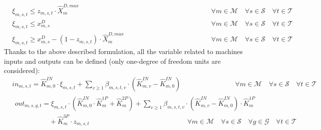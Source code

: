 \documentclass{article}
\newcommand{\cT}{{\mathcal T}}
\newcommand{\cM}{{\mathcal M}}
\newcommand{\cQ}{{\mathcal Q}}
\newcommand{\cC}{{\mathcal C}}
\newcommand{\cS}{{\mathcal S}}
\newcommand{\cG}{{\mathcal G}}
\begin{document}
{\begin{align}
		& \xi_{m,s,t} \leq z_{m,s,t} \cdot \hat{X}_{m}^{D,max} & \hspace{5cm} \forall m \in \cM \quad \forall s \in \cS \quad \forall t \in \cT \label{eq:Xi_active1}\\
		& \xi_{m,s,t} \leq x_{m,s}^D & \hspace{5cm} \forall m \in \cM \quad \forall s \in \cS \quad \forall t \in \cT \label{eq:Xi_active2}\\
		& \xi_{m,s,t} \geq x_{m,s}^D - (1-z_{m,s,t}) \cdot \hat{X}_{m}^{D,max} & \hspace{5cm} \forall m \in \cM \quad \forall s \in \cS \quad \forall t \in \cT \label{eq:Xi_active3}
		\end{align}	
Thanks to the above described formulation, all the variable related to machines inputs and outputs can be defined (only one-degree of freedom units are considered):
		\begin{align}
		& in_{m,s,t} = \hat{K}_{m,0}^{IN} \cdot \xi_{m,s,t} + \sum_{v \geq 1} \beta_{m,s,t,v} \cdot (\hat{K}_{m,v}^{IN} - \hat{K}_{m,0}^{IN} ) & \hspace{3cm} \forall m \in \cM \quad \forall s \in \cS \quad \forall t \in \cT \label{eq:in}
		\end{align}
		\begin{align}
		\begin{split}
		& out_{m,s,g,t} =  \xi_{m,s,t} \cdot \left( \hat{K}_{m,0}^{IN} \cdot \hat{K}_{m}^{1P} + \hat{K}_{m}^{2P} \right) + \sum_{v \geq 1} \beta_{m,s,t,v} \cdot (\hat{K}_{m,v}^{IN} - \hat{K}_{m,0}^{IN}) \cdot \hat{K}_{m}^{1P} \\ & \qquad \qquad \quad + \hat{K}_{m}^{3P} \cdot z_{m,s,t} \hspace{6cm} \forall m \in \cM \quad \forall s \in \cS \quad \forall g \in \cG \quad \forall t \in \cT \label{eq:out}\\
		\end{split}		
		\end{align}
		\begin{comment}
		\begin{align}
		& q_{m,s,t}^{gen} = \xi_{m,s,t} \cdot \left( \hat{K}_{m,0}^{IN} \cdot \hat{K}_{m}^{1Q} + \hat{K}_{m}^{2Q} \right) + \sum_{v \geq 1} \beta_{m,s,t,v} \cdot (\hat{K}_{m,v}^{IN} - \hat{K}_{m,0}^{IN}) \cdot \hat{K}_{m}^{1Q} + \hat{K}_{m}^{3Q} \cdot z_{m,s,t} &\forall m \in \cQ^+ \quad \forall s \in \cS \quad \forall t \in \cT \label{eq:heat_gen}\\
		& c_{m,s,t}^{gen} = \xi_{m,s,t} \cdot \left( \hat{K}_{m,0}^{IN} \cdot \hat{K}_{m}^{1C} + \hat{K}_{m}^{2C} \right) + \sum_{v \geq 1} \beta_{m,s,t,v} \cdot (\hat{K}_{m,v}^{IN} - \hat{K}_{m,0}^{IN}) \cdot \hat{K}_{m}^{1C} + \hat{K}_{m}^{3C} \cdot z_{m,s,t} &\forall m \in \cC^+ \quad \forall s \in \cS \quad \forall t \in \cT \label{eq:cold_gen}

\end{comment}}
\end{document}
